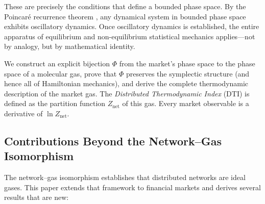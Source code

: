 \documentclass[twocolumn,10pt]{article}
\theoremstyle{remark}
\newcommand{\Znet}{Z_{\mathrm{net}}}
\begin{document}
These are precisely the conditions that define a bounded phase space.  By the Poincar\'{e} recurrence theorem \cite{poincare1890}, any dynamical system in bounded phase space exhibits oscillatory dynamics.  Once oscillatory dynamics is established, the entire apparatus of equilibrium and non-equilibrium statistical mechanics applies---not by analogy, but by mathematical identity.

We construct an explicit bijection $\Phi$ from the market's phase space to the phase space of a molecular gas, prove that $\Phi$ preserves the symplectic structure (and hence all of Hamiltonian mechanics), and derive the complete thermodynamic description of the market gas.  The \emph{Distributed Thermodynamic Index} (DTI) is defined as the partition function $\Znet$ of this gas.  Every market observable is a derivative of $\ln \Znet$.

\subsection{Contributions Beyond the Network--Gas Isomorphism}

The network--gas isomorphism establishes that distributed networks are ideal gases.  This paper extends that framework to financial markets and derives several results that are new:
\end{document}
